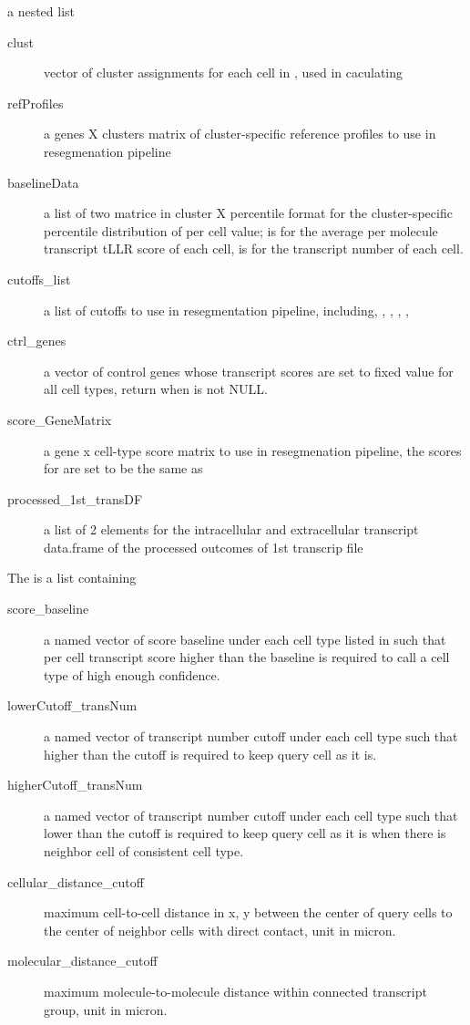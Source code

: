 \documentclass[letterpaper]{book}
\begin{document}
\begin{Value}
a nested list
\begin{description}

\item[clust] vector of cluster assignments for each cell in , used in caculating 
\item[refProfiles] a genes X clusters matrix of cluster-specific reference profiles to use in resegmenation pipeline
\item[baselineData] a list of two matrice in cluster X percentile format for the cluster-specific percentile distribution of per cell value;  is for the average per molecule transcript tLLR score of each cell,  is for the transcript number of each cell.
\item[cutoffs\_list] a list of cutoffs to use in resegmentation pipeline, including, , , , , 
\item[ctrl\_genes] a vector of control genes whose transcript scores are set to fixed value for all cell types, return when  is not NULL.
\item[score\_GeneMatrix] a gene x cell-type score matrix to use in resegmenation pipeline, the scores for  are set to be the same as 
\item[processed\_1st\_transDF] a list of 2 elements for the intracellular and extracellular transcript data.frame of the processed outcomes of 1st transcrip file

\end{description}

The  is a list containing
\begin{description}

\item[score\_baseline] a named vector of score baseline under each cell type listed in  such that  per cell transcript score higher than the baseline is required to call a cell type of high enough confidence.
\item[lowerCutoff\_transNum] a named vector of transcript number cutoff under each cell type such that higher than the cutoff is required to keep query cell as it is.
\item[higherCutoff\_transNum] a named vector of transcript number cutoff under each cell type such that lower than the cutoff is required to keep query cell as it is when there is neighbor cell of consistent cell type.
\item[cellular\_distance\_cutoff] maximum cell-to-cell distance in x, y between the center of query cells to the center of neighbor cells with direct contact, unit in micron. 
\item[molecular\_distance\_cutoff] maximum molecule-to-molecule distance within connected transcript group, unit in micron.

\end{description}

\end{Value}
\end{document}
